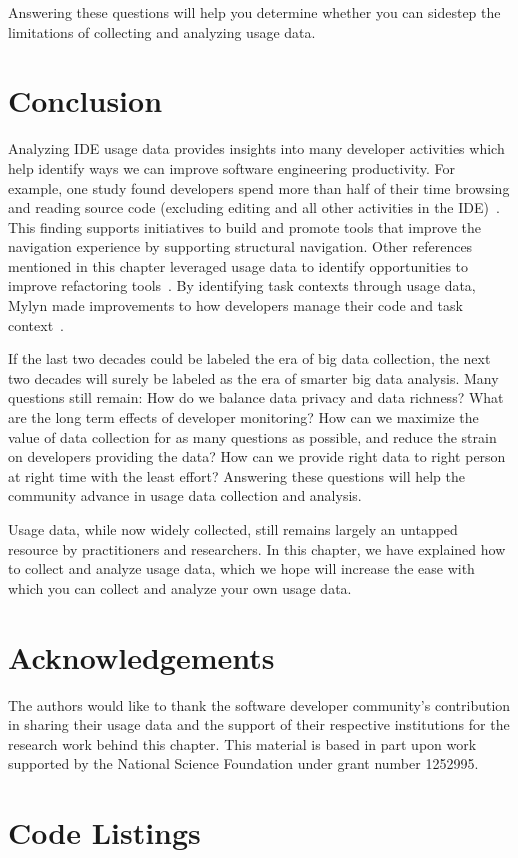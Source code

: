 \documentclass[authoryear]{elsarticle}
\begin{document}
\noindent
Answering these questions will help you determine whether you can sidestep
the limitations of collecting and analyzing usage data.

\section{Conclusion}

Analyzing IDE usage data provides insights into many developer activities which help identify ways we can improve software engineering productivity.  For example, one study found developers spend more than half of their time browsing and reading source code (excluding editing and all other activities in the IDE)~\citep{SnipesExperiencesGamifyingSoftwareDevelopment}.  This finding supports initiatives to build and promote tools that improve the navigation experience by supporting structural navigation.  Other references mentioned in this chapter leveraged usage data to identify opportunities to improve refactoring tools~\citep{VakilianJohnson2014Alternate,MurphyHill2012Improving}.  By identifying task contexts through usage data, Mylyn made improvements to how developers manage their code and task context~\citep{Kersten-Mylyn}.  

If the last two decades could be labeled the era
of big data collection,
the next two decades will surely be labeled as the
era of smarter big data analysis.
Many questions still remain:
How do we balance data privacy and data richness?
What are the long term effects of developer monitoring?
How can we maximize the value of data collection
for as many questions as possible, and reduce the
strain on developers providing the data? How can we provide right data to right person at right time with the least effort?
Answering these questions will help the
community advance in usage data collection and analysis.

Usage data, while now widely collected, still remains largely
an untapped resource by practitioners and researchers.
In this chapter, we have explained how to collect and
analyze usage data, which we hope will increase the ease
with which you can collect and analyze your own usage data.


\section{Acknowledgements}

The authors would like to thank the software developer community's contribution in sharing their usage data and the support of their respective institutions for the research work behind this chapter.  This material is based in part upon work supported by the National 
Science Foundation under grant number 1252995.

\section{Code Listings}



 
\end{document}
